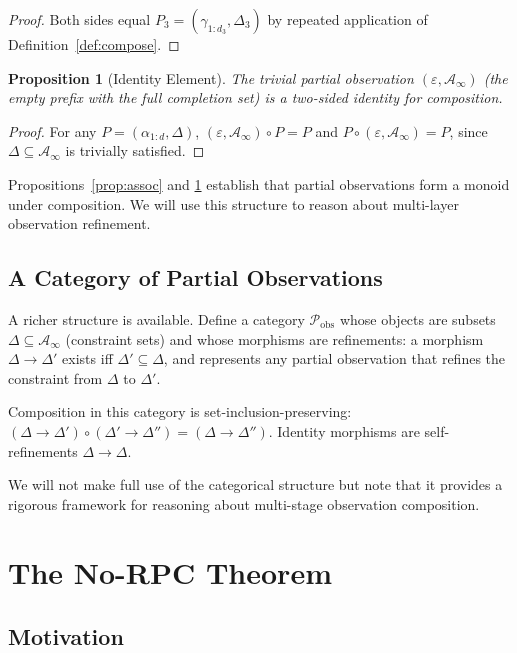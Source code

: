 \documentclass[11pt,twocolumn,a4paper]{article}
\newtheorem{proposition}[theorem]{Proposition}
\theoremstyle{definition}
\theoremstyle{remark}
\newcommand{\Pc}{\mathcal{P}}
\newcommand{\Ac}{\mathcal{A}}
\begin{document}
\begin{proof}
Both sides equal $P_3 = (\gamma_{1:d_3}, \Delta_3)$ by repeated application of Definition~\ref{def:compose}.
\end{proof}

\begin{proposition}[Identity Element]
\label{prop:identity-el}
The trivial partial observation $(\varepsilon, \Ac_\infty)$ (the empty prefix with the full completion set) is a two-sided identity for composition.
\end{proposition}

\begin{proof}
For any $P = (\alpha_{1:d}, \Delta)$, $(\varepsilon, \Ac_\infty) \circ P = P$ and $P \circ (\varepsilon, \Ac_\infty) = P$, since $\Delta \subseteq \Ac_\infty$ is trivially satisfied.
\end{proof}

Propositions~\ref{prop:assoc} and \ref{prop:identity-el} establish that partial observations form a monoid under composition. We will use this structure to reason about multi-layer observation refinement.

\subsection{A Category of Partial Observations}

A richer structure is available. Define a category $\Pc_{\text{obs}}$ whose objects are subsets $\Delta \subseteq \Ac_\infty$ (constraint sets) and whose morphisms are refinements: a morphism $\Delta \to \Delta'$ exists iff $\Delta' \subseteq \Delta$, and represents any partial observation that refines the constraint from $\Delta$ to $\Delta'$.

Composition in this category is set-inclusion-preserving: $(\Delta \to \Delta') \circ (\Delta' \to \Delta'') = (\Delta \to \Delta'')$. Identity morphisms are self-refinements $\Delta \to \Delta$.

We will not make full use of the categorical structure but note that it provides a rigorous framework for reasoning about multi-stage observation composition.

\section{The No-RPC Theorem}
\label{sec:norpc}

\subsection{Motivation}
\end{document}
